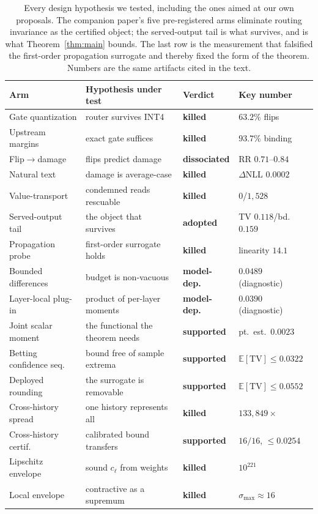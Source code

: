\documentclass[11pt]{article}
\renewcommand{\_}{\WCorigunderscore\allowbreak}
\begin{document}
\begin{table}[htbp]\centering\small
\setlength{\tabcolsep}{3pt}\footnotesize
\begin{tabular}{@{}llll@{}}
\toprule
Arm & Hypothesis under test & Verdict & Key number\\
\midrule
Gate quantization & router survives INT4 & \textbf{killed} & $63.2\%$ flips\\
Upstream margins & exact gate suffices & \textbf{killed} & $93.7\%$ binding\\
Flip$\to$damage & flips predict damage & \textbf{dissociated} & RR $0.71$--$0.84$\\
Natural text & damage is average-case & \textbf{killed} & $\Delta$NLL $0.0002$\\
Value-transport & condemned reads rescuable & \textbf{killed} & $0$/$1{,}528$\\
\midrule
Served-output tail & the object that survives & \textbf{adopted} & TV $0.118$/bd.\ $0.159$\\
Propagation probe & first-order surrogate holds & \textbf{killed} & linearity $14.1$\\
Bounded differences & budget is non-vacuous & \textbf{model-dep.} & $0.0489$ (diagnostic)\\
Layer-local plug-in & product of per-layer moments & \textbf{model-dep.} & $0.0390$ (diagnostic)\\
Joint scalar moment & the functional the theorem needs & \textbf{supported} & pt.\ est.\ $0.0023$\\
Betting confidence seq. & bound free of sample extrema & \textbf{supported} & $\mathbb{E}[\mathrm{TV}]\le0.0322$\\
Deployed rounding & the surrogate is removable & \textbf{supported} & $\mathbb{E}[\mathrm{TV}]\le0.0552$\\
Cross-history spread & one history represents all & \textbf{killed} & $133{,}849\times$\\
Cross-history certif. & calibrated bound transfers & \textbf{supported} & $16/16$, $\le0.0254$\\
Lipschitz envelope & sound $c_\ell$ from weights & \textbf{killed} & $10^{221}$\\
Local envelope & contractive as a supremum & \textbf{killed} & $\sigma_{\max}\approx16$\\
\bottomrule
\end{tabular}
\caption{Every design hypothesis we tested, including the ones aimed at
our own proposals. The companion paper's five pre-registered arms
eliminate routing invariance as the certified object; the served-output
tail is what survives, and is what Theorem~\ref{thm:main} bounds. The last row is the measurement that
falsified the first-order propagation surrogate and thereby fixed the
form of the theorem. Numbers are the same artifacts cited in the text.}
\label{tab:adjudication}
\end{table}
\end{document}
